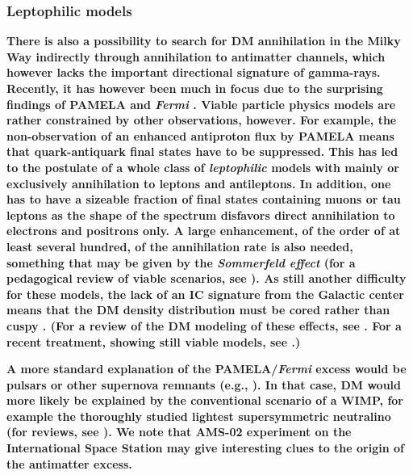 \documentclass[10pt,aps,pra,reprint,amsmath,amsfonts,amssymb,showpacs,nofootinbib,floatfix]{revtex4-1}
\def\C#1{{\bf #1}}
\newcommand{\Fermi}{{\em Fermi}\xspace}
\begin{document}
\subsubsection{Leptophilic models}
\label{sect:LP}
\C{There is also a possibility to search for DM annihilation in the Milky
Way indirectly through annihilation to antimatter channels, which
however lacks the important directional signature of
gamma-rays. Recently, it has however been much in focus due to the
surprising findings of PAMELA \cite{Adriani:2008zr} and \Fermi
\cite{Abdo:2009zk}. Viable particle physics models are rather
constrained by other observations, however. For example, the
non-observation of an enhanced antiproton flux by PAMELA
\cite{Adriani:2010rc} means that quark-antiquark final states have to
be suppressed. This has led to the postulate of a whole class of
{\em leptophilic} models with mainly or exclusively annihilation to
leptons and antileptons. In addition, one has to have a sizeable
fraction of final states containing muons or tau leptons as the shape
of the spectrum disfavors direct annihilation to electrons and
positrons only. A large enhancement, of the order of at least several
hundred, of the annihilation rate is also needed, something that may
be given by the {\em Sommerfeld effect} (for a pedagogical review of
viable scenarios, see \cite{ArkaniHamed:2008qn}). As still another
difficulty for these models, the lack of an IC signature from the
Galactic center means that the DM density distribution must be cored
rather than cuspy
\cite{Bertone:2008xr,Cirelli:2008pk,Bergstrom:2008ag}. (For a review
of the DM modeling of these effects, see \cite{Bergstrom:2009ib}. For
a recent treatment, showing still viable models, see
\cite{Finkbeiner:2010sm}.)}

\C{A more standard explanation of the PAMELA/\Fermi excess would be
pulsars or other supernova remnants (e.g.,
\cite{1995PhRvD..52.3265A,Hooper:2008kg,Ahlers:2009ae}). In that case,
DM would more likely be explained by the conventional scenario of a
WIMP, for example the thoroughly studied lightest supersymmetric
neutralino (for reviews, see
\cite{Jungman:1995df,Bergstrom:2000pn,Bertone:2004pz}). We note that
AMS-02 experiment on the International Space Station \cite{ams02} may give
interesting clues to the origin of the antimatter excess.}
\end{document}
